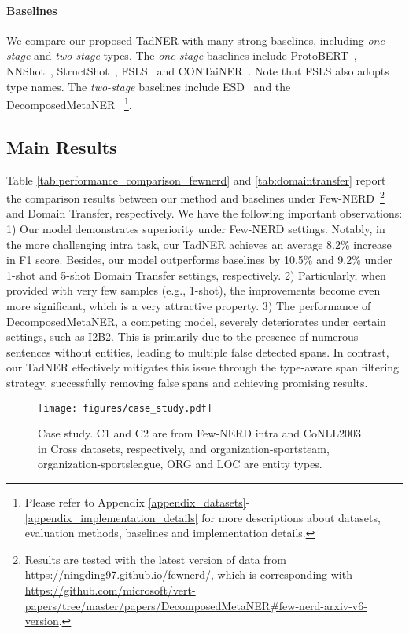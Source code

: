 \documentclass[11pt]{article}
\newcommand{\ours}{{TadNER}\xspace}
\begin{document}
\paragraph{Baselines}
We compare our proposed \ours with many strong baselines, including \emph{one-stage} and \emph{two-stage} types.
The \emph{one-stage} baselines include ProtoBERT~\cite{snell_prototypical_2017}, NNShot~\cite{yang-katiyar-2020-simple}, StructShot~\cite{yang-katiyar-2020-simple}, FSLS~\cite{ma2022label} and CONTaiNER~\cite{das-etal-2022-container}. 
Note that FSLS also adopts type names.
The \emph{two-stage} baselines include ESD~\cite{wang-2022-enhanced} and the DecomposedMetaNER~\cite{ma-etal-2022-decomposed}
\footnote{Please refer to Appendix \ref{appendix_datasets}-\ref{appendix_implementation_details} for more descriptions about datasets, evaluation methods, baselines and implementation details.}.


\subsection{Main Results}

Table \ref{tab:performance_comparison_fewnerd} and \ref{tab:domaintransfer} report the comparison results between our method and baselines under {Few-NERD}~\footnote{Results are tested with the latest version of data from \url{https://ningding97.github.io/fewnerd/}, which is corresponding with \url{https://github.com/microsoft/vert-papers/tree/master/papers/DecomposedMetaNER\#few-nerd-arxiv-v6-version}.} and {Domain Transfer}, respectively.
We have the following important observations: 
1) Our model demonstrates superiority under {Few-NERD} settings. Notably, in the more challenging {intra} task, our \ours achieves an average 8.2\% increase in F1 score. 
Besides, our model outperforms baselines by 10.5\% and 9.2\% under 1-shot and 5-shot Domain Transfer settings, respectively.
2) Particularly, when provided with very few samples (e.g., 1-shot), the improvements become even more significant, which is a very attractive property.
3) The performance of DecomposedMetaNER, a competing model, severely deteriorates under certain settings, such as I2B2. 
This is primarily due to the presence of numerous sentences without entities, leading to multiple false detected spans.
In contrast, our \ours effectively mitigates this issue through the type-aware span filtering strategy, successfully removing false spans and achieving promising results.

\begin{figure*}[t]
\vspace{-0mm}
\centering
\texttt{[image: figures/case\_study.pdf]}
\caption{Case study.
 C1 and C2 are from Few-NERD intra and CoNLL2003 in Cross datasets, respectively, and \textcolor[RGB]{0,176,80}{organization-sportsteam}, \textcolor[RGB]{197,90,17}{organization-sportsleague}, \textcolor[RGB]{114,172,225}{ORG} and \textcolor[RGB]{239,116,33}{LOC} are entity types.
}
\label{fig_case_study}
\vspace{-0mm}
\end{figure*}
\end{document}
